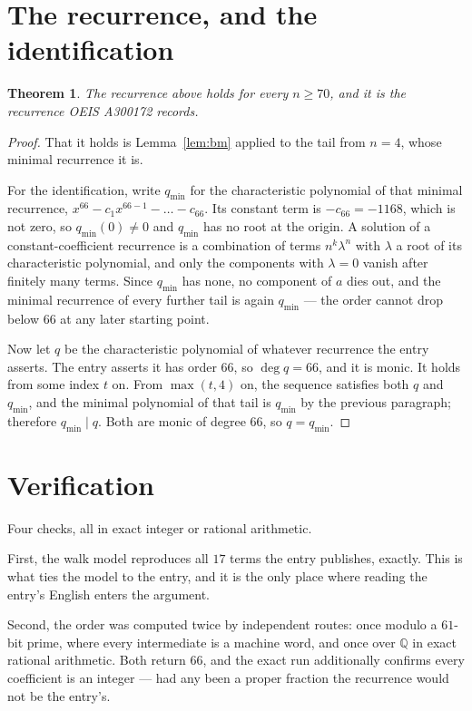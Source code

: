 \documentclass[11pt,a4paper]{article}
\theoremstyle{plain}
\newtheorem{theorem}{Theorem}
\theoremstyle{definition}
\begin{document}
\section{The recurrence, and the identification}

\begin{theorem}
The recurrence above holds for every $n\ge70$, and it is the recurrence OEIS A300172 records.
\end{theorem}

\begin{proof}
That it holds is Lemma~\ref{lem:bm} applied to the tail from $n=4$, whose minimal
recurrence it is.

For the identification, write $q_{\min}$ for the characteristic polynomial of that minimal
recurrence, $x^{66}-c_1x^{66-1}-\dots-c_{66}$. Its constant term is
$-c_{66}=-1168$, which is not zero, so $q_{\min}(0)\neq0$ and $q_{\min}$ has no
root at the origin. A solution of a constant-coefficient recurrence is a combination of terms
$n^{k}\lambda^{n}$ with $\lambda$ a root of its characteristic polynomial, and only the
components with $\lambda=0$ vanish after finitely many terms. Since $q_{\min}$ has none, no
component of $a$ dies out, and the minimal recurrence of every further tail is again
$q_{\min}$ --- the order cannot drop below $66$ at any later starting point.

Now let $q$ be the characteristic polynomial of whatever recurrence the entry asserts. The
entry asserts it has order $66$, so $\deg q=66$, and it is monic. It holds from some
index $t$ on. From $\max(t,4)$ on, the sequence satisfies both $q$ and $q_{\min}$, and
the minimal polynomial of that tail is $q_{\min}$ by the previous paragraph; therefore
$q_{\min}\mid q$. Both are monic of degree $66$, so $q=q_{\min}$.
\end{proof}

\section{Verification}

Four checks, all in exact integer or rational arithmetic.

First, the walk model reproduces all $17$ terms the entry publishes, exactly. This is
what ties the model to the entry, and it is the only place where reading the entry's English
enters the argument.

Second, the order was computed twice by independent routes: once modulo a $61$-bit prime, where
every intermediate is a machine word, and once over $\mathbb{Q}$ in exact rational arithmetic.
Both return $66$, and the exact run additionally confirms every coefficient is an integer
--- had any been a proper fraction the recurrence would not be the entry's.
\end{document}

